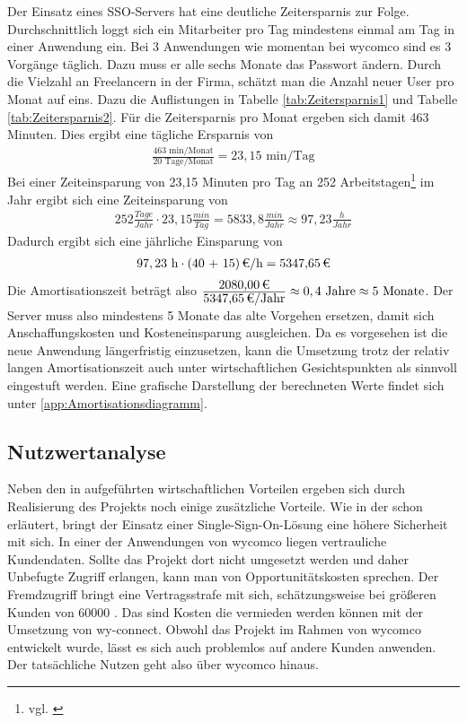 Der Einsatz eines \ac{SSO}-Servers hat eine deutliche Zeitersparnis zur Folge. Durchschnittlich loggt sich ein Mitarbeiter pro Tag mindestens einmal am Tag in einer Anwendung ein. Bei 3 Anwendungen wie momentan bei wycomco sind es 3 Vorgänge täglich. Dazu muss er alle sechs Monate das Passwort ändern. Durch die Vielzahl an Freelancern in der Firma, schätzt man die Anzahl neuer User pro Monat auf eins. 
Dazu die Auflistungen in Tabelle \ref{tab:Zeitersparnis1} und Tabelle \ref{tab:Zeitersparnis2}.
Für die Zeitersparnis pro Monat ergeben sich damit 463 Minuten. 
Dies ergibt eine tägliche Ersparnis von
\begin{eqnarray}
\frac{463 \mbox{ min/Monat}}{20 \mbox{ Tage/Monat}} = 23,15 \mbox{ min/Tag}
\end{eqnarray}
Bei einer Zeiteinsparung von 23,15 Minuten pro Tag an 252 Arbeitstagen\footnote{vgl. \cite{arbeitstage}} im Jahr ergibt sich eine Zeiteinsparung von 
\begin{eqnarray}
252 \frac{Tage}{Jahr} \cdot 23,15 \frac{min}{Tag} = 5833,8 \frac{min}{Jahr} \approx 97,23 \frac{h}{Jahr} 
\end{eqnarray}
Dadurch ergibt sich eine jährliche Einsparung von 
\begin{eqnarray}
97,23 \mbox{ h} \cdot \eur{(40 + 15)}{\mbox{/h}} = \eur{5347,65}
\end{eqnarray}
Die Amortisationszeit beträgt also $\frac{\eur{2080,00}}{\eur{5347,65}\mbox{/Jahr}} \approx 0,4 \mbox{ Jahre} \approx 5 \mbox{ Monate}$.
Der Server muss also mindestens 5 Monate das alte Vorgehen ersetzen, damit sich Anschaffungskosten und Kosteneinsparung ausgleichen. Da es vorgesehen ist die neue Anwendung längerfristig einzusetzen, kann die Umsetzung trotz der relativ langen Amortisationszeit auch unter wirtschaftlichen Gesichtspunkten als sinnvoll eingestuft werden.
Eine grafische Darstellung der berechneten Werte findet sich unter \ref{app:Amortisationsdiagramm}.

\subsection{Nutzwertanalyse}
\label{sec:Nutzwertanalyse}

Neben den in  aufgeführten wirtschaftlichen Vorteilen ergeben sich durch Realisierung des Projekts noch einige zusätzliche Vorteile.
Wie in der  schon erläutert, bringt der Einsatz einer Single-Sign-On-Lösung eine höhere Sicherheit mit sich. In einer der Anwendungen von wycomco liegen vertrauliche Kundendaten. Sollte das Projekt dort nicht umgesetzt werden und daher Unbefugte Zugriff erlangen, kann man von Opportunitätskosten sprechen. Der Fremdzugriff bringt eine Vertragsstrafe mit sich, schätzungsweise bei größeren Kunden von 60000 \eur. Das sind Kosten die vermieden werden können mit der Umsetzung von wy-connect. 
Obwohl das Projekt im Rahmen von wycomco entwickelt wurde, lässt es sich auch problemlos auf andere Kunden anwenden. Der tatsächliche Nutzen geht also über wycomco hinaus.

